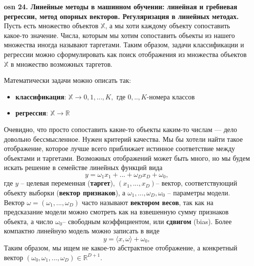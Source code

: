 

\textbf{\LARGE osn 24. Линейные методы в машинном обучении: линейная и гребневая регрессии, метод опорных векторов. Регуляризация в линейных методах. }  \\

Пусть есть множество объектов $\mathbb{X}$, а мы хоти каждому объекту сопоставить какое-то значение.
Числа, которым мы хотим сопоставить объекты из нашего множества иногда называют таргетами.
Таким образом, задачи классификации и регрессии можно сформулировать как поиск отображения из множества объектов $\mathbb{X}$ в множество возможных таргетов.

Математически задачи можно описать так:
\begin{itemize}
    \item \textbf{классификация}: $\mathbb{X} \xrightarrow{}0,1,...,K,$ где $0,..,K$-номера классов
    \item \textbf{регрессия}:  $\mathbb{X} \xrightarrow{} \mathbb{R}$
\end{itemize}
Очевидно, что просто сопоставить какие-то объекты каким-то числам — дело довольно бессмысленное. Нужен критерий качества. Мы бы хотели найти такое отображение, которое лучше всего приближает истинное соответствие между объектами и таргетами. Возможных отображений может быть много, но мы будем искать решение в семействе линейных функций вида 
\begin{equation*}
    y = \omega_1x_1+...+\omega_Dx_D+\omega_0,
\end{equation*}
где $y$ – целевая переменная (\textbf{таргет}), $(x_1,...,x_D)$– вектор, соответствующий объекту выборки (\textbf{вектор признаков}), а $\omega_1,...,\omega_D,\omega_0$ – параметры модели. Вектор $\omega=(\omega_1,...,\omega_D)$ часто называют \textbf{вектором весов}, так как на предсказание модели можно смотреть как на взвешенную сумму признаков объекта, а число $\omega_0$– свободным коэффициентом, или \textbf{сдвигом} (bias). Более компактно линейную модель можно записать в виде
\begin{equation*}
    y = \langle{x, \omega}\rangle+\omega_0,
\end{equation*}
Таким образом, мы ищем не какое-то абстрактное отображение, а конкретный вектор $(\omega_0,\omega_1,...,\omega_D) \in \mathbb{R}^{D+1}.$ \\

